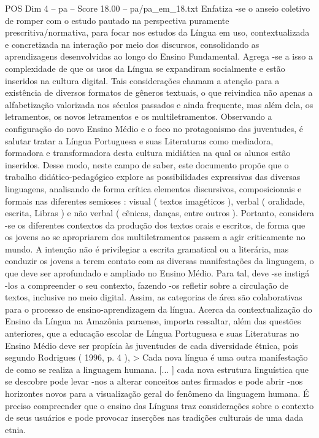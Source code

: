\begin{textsample}{POS Dim 4 – pa – Score 18.00 – pa/pa\_em\_18.txt}
Enfatiza -se o anseio coletivo de romper com o estudo pautado na perspectiva puramente prescritiva/normativa, para focar nos estudos da Língua em uso, contextualizada e concretizada na interação por meio dos discursos, consolidando as aprendizagens desenvolvidas ao longo do Ensino Fundamental.
Agrega -se a isso a complexidade de que os usos da Língua se expandiram socialmente e estão inseridos na cultura digital.
Tais considerações chamam a atenção para a existência de diversos formatos de gêneros textuais, o que reivindica não apenas a alfabetização valorizada nos séculos passados e ainda frequente, mas além dela, os letramentos, os novos letramentos e os multiletramentos.
Observando a configuração do novo Ensino Médio e o foco no protagonismo das juventudes, é salutar tratar a Língua Portuguesa e suas Literaturas como mediadora, formadora e transformadora desta cultura midiática na qual os alunos estão inseridos.
Desse modo, neste campo de saber, este documento propõe que o trabalho didático-pedagógico explore as possibilidades expressivas das diversas linguagens, analisando de forma crítica elementos discursivos, composicionais e formais nas diferentes semioses : visual ( textos imagéticos ), verbal ( oralidade, escrita, Libras ) e não verbal ( cênicas, danças, entre outros ).
Portanto, considera -se os diferentes contextos da produção dos textos orais e escritos, de forma que os jovens ao se apropriarem dos multiletramentos passem a agir criticamente no mundo.
A intenção não é privilegiar a escrita gramatical ou a literária, mas conduzir os jovens a terem contato com as diversas manifestações da linguagem, o que deve ser aprofundado e ampliado no Ensino Médio.
Para tal, deve -se instigá -los a compreender o seu contexto, fazendo -os refletir sobre a circulação de textos, inclusive no meio digital.
Assim, as categorias de área são colaborativas para o processo de ensino-aprendizagem da língua.
Acerca da contextualização do Ensino da Língua na Amazônia paraense, importa ressaltar, além das questões anteriores, que a educação escolar de Língua Portuguesa e suas Literaturas no Ensino Médio deve ser propícia às juventudes de cada diversidade étnica, pois segundo Rodrigues ( 1996, p. 4 ), > Cada nova língua é uma outra manifestação de como se realiza a linguagem humana. [... ] cada nova estrutura linguística que se descobre pode levar -nos a alterar conceitos antes firmados e pode abrir -nos horizontes novos para a visualização geral do fenômeno da linguagem humana.
É preciso compreender que o ensino das Línguas traz considerações sobre o contexto de seus usuários e pode provocar inserções nas tradições culturais de uma dada etnia.

\end{textsample}
